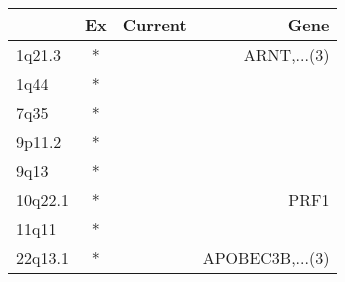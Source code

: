 \begin{tabular}{lccr}
\toprule
{} & Ex & Current &             Gene \\
\midrule
1q21.3  &  * &         &      ARNT,...(3) \\
1q44    &  * &         &                  \\
7q35    &  * &         &                  \\
9p11.2  &  * &         &                  \\
9q13    &  * &         &                  \\
10q22.1 &  * &         &             PRF1 \\
11q11   &  * &         &                  \\
22q13.1 &  * &         &  APOBEC3B,...(3) \\
\bottomrule
\end{tabular}
